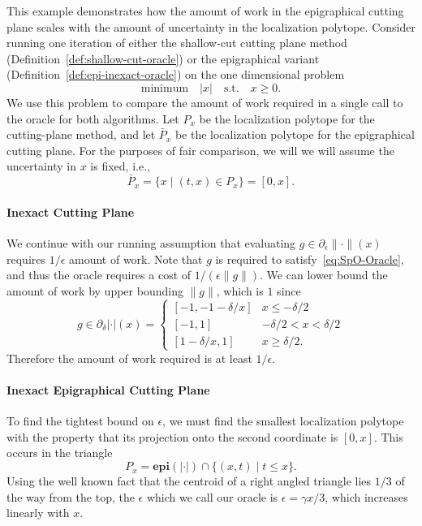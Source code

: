 \begin{example}

  This example demonstrates how the amount of work in the epigraphical
  cutting plane scales with the amount of uncertainty in the
  localization polytope. Consider running one iteration of either the
  shallow-cut cutting plane method
  (Definition~\ref{def:shallow-cut-oracle}) or the epigraphical
  variant (Definition~\ref{def:epi-inexact-oracle}) on the one
  dimensional problem
\[
\text{minimum} \quad |x| \quad \text{s.t.} \quad x \geq 0.
\]
We use this problem to compare the amount of work required in a single
call to the oracle for both algorithms. Let $P_x$ be the localization
polytope for the cutting-plane method, and let $\bar{P}_x$ be the
localization polytope for the epigraphical cutting plane. For the
purposes of fair comparison, we will we will assume the uncertainty in
$x$ is fixed, i.e.,
\[
  \bar{P}_x = \{x \mid (t,x) \in P_x\} = [0, x].
\] 

\paragraph{\bf Inexact Cutting Plane} We continue with our running
assumption that evaluating $g \in \partial_\epsilon\|\cdot\|(x)$
requires $1/\epsilon$ amount of work. Note that $g$ is required to satisfy~\eqref{eq:SpO-Oracle}, and thus the oracle requires a cost of $1/(\epsilon \|g\|)$.  We can lower bound the amount of work by upper bounding $\|g\|$, which is $1$ since
\[
  g \in \partial_{\delta}|\cdot|(x)
  =
  \begin{cases}
    [-1,-1-\delta/x] & x\leq-\delta/2
\\   [-1,1]               & -\delta/2< x<\delta/2
\\  [1-\delta/x,1] & x\geq\delta/2.
\end{cases}
\]
Therefore the amount of work required is at least $1/\epsilon$. 
 
\paragraph{\bf Inexact Epigraphical Cutting Plane} To find the tightest
bound on $\epsilon$, we must find the smallest localization polytope
with the property that its projection onto the second coordinate is 
$[0,x]$. This occurs in the triangle
\[
  P_x = \mathbf{epi}(|\cdot|) \cap \{(x,t) \mid t \leq x\}.
\]
Using the well known fact that the centroid of a right angled triangle
lies $1/3$ of the way from the top, the $\epsilon$ which we call our
oracle is $\epsilon = \gamma x/3$, which increases linearly with $x$.
 

\end{example}
